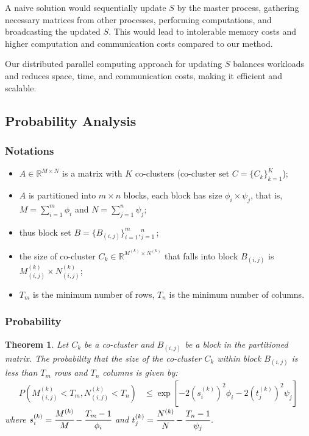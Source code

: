 \documentclass[journal]{IEEEtran}
\newtheorem{theorem}{Theorem}
\begin{document}
A naive solution would sequentially update $S$ by the master process, gathering necessary matrices from other processes, performing computations, and broadcasting the updated $S$. This would lead to intolerable memory costs and higher computation and communication costs compared to our method.

Our distributed parallel computing approach for updating $S$ balances workloads and reduces space, time, and communication costs, making it efficient and scalable.
\subsection{Probability Analysis}

\subsubsection{Notations}
\label{subsec:probability}
\begin{itemize}
  \item $A \in \mathbb{R}^{M \times N}$ is a matrix with $K$ co-clusters (co-cluster set $C = \{C_k\}_{k=1}^K$);
  \item $A$ is partitioned into $m \times n$ blocks, each block has size $\phi_i \times \psi_j$, that is, $M=\sum_{i=1}^m \phi_i$ and $N=\sum_{j=1}^n \psi_j$;
  \item thus block set $B = \{B_{(i,j)}\}_{i=1}^m,_{j=1}^n$;
  \item the size of co-cluster $C_k \in \mathbb{R}^{M^{(k)} \times N^{(k)}}$ that falls into block $B_{(i,j)}$ is $M_{(i,j)}^{(k)} \times N_{(i,j)}^{(k)}$;
  \item $T_m$ is the minimum number of rows, $T_n$ is the minimum number of columns.
\end{itemize}

\subsubsection{Probability}

\begin{theorem}
  \label{thm:joint_probability}
  Let $C_k$ be a co-cluster and $B_{(i,j)}$ be a block in the partitioned matrix. The probability that the size of the co-cluster $C_k$ within block $B_{(i,j)}$ is less than $T_m$ rows and $T_n$ columns is given by:
  \begin{align*}
    P(M_{(i,j)}^{(k)} < T_m, N_{(i,j)}^{(k)} < T_n) & \le \exp[-2 (s_i^{(k)})^2 \phi_i -2 (t_j^{(k)})^2 \psi_j]
  \end{align*}
  where $s_i^{(k)} = \cfrac{M^{(k)}}{M}-\cfrac{T_m-1}{\phi_i}$ and $t_j^{(k)} = \cfrac{N^{(k)}}{N}-\cfrac{T_n-1}{\psi_j}$.
\end{theorem}
\end{document}

